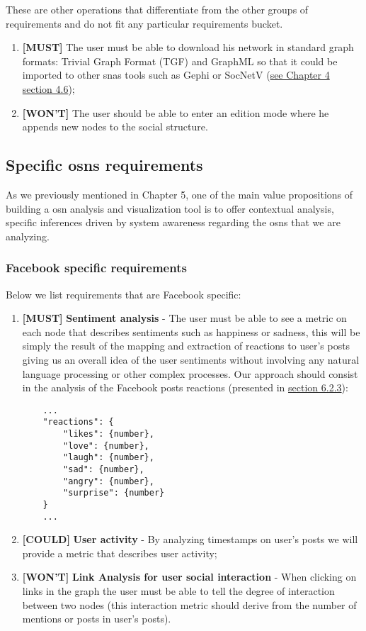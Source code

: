 These are other operations that differentiate from the other groups of requirements and do not fit any particular requirements bucket.

\begin{enumerate}
    \item \textbf{[MUST]} The user must be able to download his network in standard graph formats: Trivial Graph Format (TGF) and GraphML so that it could be imported to other \glspl{sna} tools such as Gephi or SocNetV (\hyperref[sec:snas]{see Chapter 4 section 4.6});
    \item \textbf{[WON'T]} The user should be able to enter an edition mode where he appends new nodes to the social structure.
\end{enumerate}


\subsection{Specific \glspl{osn} requirements}

As we previously mentioned in Chapter 5, one of the main value propositions of building a \gls{osn} analysis and visualization tool is to offer contextual analysis, specific inferences driven by system awareness regarding the \glspl{osn} that we are analyzing.

\subsubsection*{Facebook specific requirements}

Below we list requirements that are Facebook specific:

\begin{enumerate}
    \item \textbf{[MUST]} \textbf{Sentiment analysis} - The user must be able to see a metric on each node that describes sentiments such as happiness or sadness, this will be simply the result of the mapping and extraction of reactions to user's posts giving us an overall idea of the user sentiments without involving any natural language processing or other complex processes. Our approach should consist in the analysis of the Facebook posts reactions (presented in \hyperref[sec:dataminer]{section 6.2.3}):
    \begin{verbatim}
    ...
    "reactions": {
        "likes": {number},
        "love": {number},
        "laugh": {number},
        "sad": {number},
        "angry": {number},
        "surprise": {number}
    }
    ...
    \end{verbatim}
    \item \textbf{[COULD]} \textbf{User activity} - By analyzing timestamps on user's posts we will provide a metric that describes user activity;
    \item \textbf{[WON'T]} \textbf{Link Analysis for user social interaction} - When clicking on links in the graph the user must be able to tell the degree of interaction between two nodes (this interaction metric should derive from the number of mentions or posts in user's posts).
\end{enumerate}

